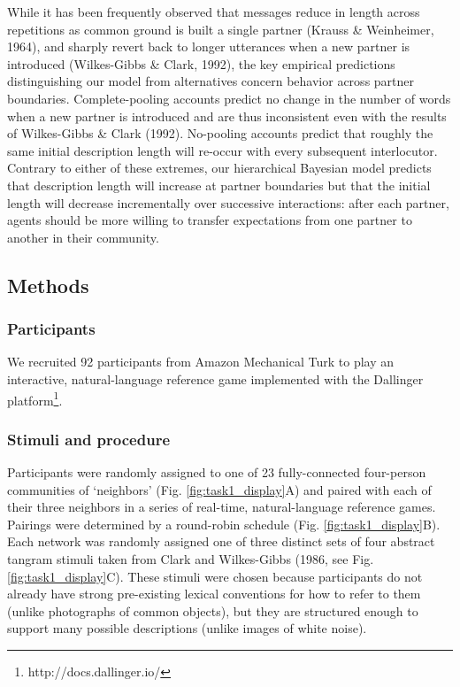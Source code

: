 \documentclass[10pt, letterpaper]{article}
\begin{document}
While it has been frequently observed that messages reduce in length
across repetitions as common ground is built a single partner (Krauss \&
Weinheimer, 1964), and sharply revert back to longer utterances when a
new partner is introduced (Wilkes-Gibbs \& Clark, 1992), the key
empirical predictions distinguishing our model from alternatives concern
behavior across partner boundaries. Complete-pooling accounts predict no
change in the number of words when a new partner is introduced and are
thus inconsistent even with the results of Wilkes-Gibbs \& Clark (1992).
No-pooling accounts predict that roughly the same initial description
length will re-occur with every subsequent interlocutor. Contrary to
either of these extremes, our hierarchical Bayesian model predicts that
description length will increase at partner boundaries but that the
initial length will decrease incrementally over successive interactions:
after each partner, agents should be more willing to transfer
expectations from one partner to another in their community.

\hypertarget{methods}{%
\subsection{Methods}\label{methods}}

\hypertarget{participants}{%
\subsubsection{Participants}\label{participants}}

We recruited 92 participants from Amazon Mechanical Turk to play an
interactive, natural-language reference game implemented with the
Dallinger platform\footnote{http://docs.dallinger.io/}.

\hypertarget{stimuli-and-procedure}{%
\subsubsection{Stimuli and procedure}\label{stimuli-and-procedure}}

Participants were randomly assigned to one of 23 fully-connected
four-person communities of `neighbors' (Fig. \ref{fig:task1_display}A)
and paired with each of their three neighbors in a series of real-time,
natural-language reference games. Pairings were determined by a
round-robin schedule (Fig. \ref{fig:task1_display}B). Each network was
randomly assigned one of three distinct sets of four abstract tangram
stimuli taken from Clark and Wilkes-Gibbs (1986, see Fig.
\ref{fig:task1_display}C). These stimuli were chosen because
participants do not already have strong pre-existing lexical conventions
for how to refer to them (unlike photographs of common objects), but
they are structured enough to support many possible descriptions (unlike
images of white noise).
\end{document}
